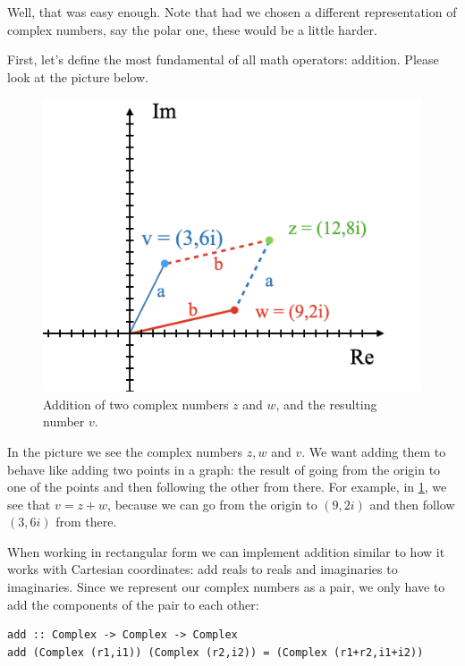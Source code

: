 Well, that was easy enough. Note that had we chosen a different representation of complex numbers, say the polar one, these would be a little harder. 

First, let's define the most fundamental of all math operators: addition. Please look at the picture below.

\begin{figure}[h!]
    \centering
    \includegraphics[scale= 0.4]{Addition.png}
    \caption{Addition of two complex numbers $z$ and $w$, and the resulting number $v$.}
    \label{addition}
\end{figure}

In the picture we see the complex numbers $z, w$ and $v$. We want adding them to behave like adding two points in a graph: the result of going from the origin to one of the points and then following the other from there. For example, in \ref{addition}, we see that $v = z + w$, because we can go from the origin to $(9,2i)$ and then follow $(3,6i)$ from there. 

When working in rectangular form we can implement addition similar to how it works with Cartesian coordinates: add reals to reals and imaginaries to imaginaries. Since we represent our complex numbers as a pair, we only have to add the components of the pair to each other: 
\begin{verbatim}
add :: Complex -> Complex -> Complex
add (Complex (r1,i1)) (Complex (r2,i2)) = (Complex (r1+r2,i1+i2))
\end{verbatim}

